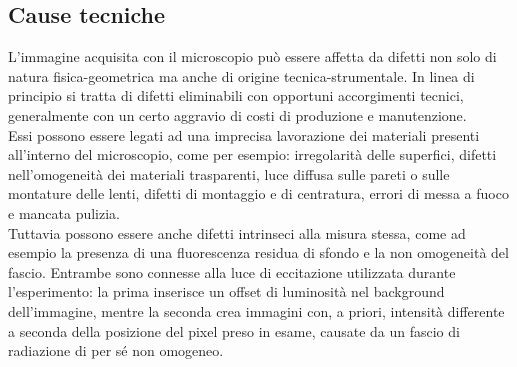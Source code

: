 \subsection {Cause tecniche} 

L'immagine acquisita con il microscopio può essere affetta da difetti non solo di natura fisica-geometrica ma anche di origine tecnica-strumentale. In linea di principio si tratta di difetti eliminabili con opportuni accorgimenti tecnici, generalmente con un certo aggravio di costi di produzione e manutenzione.\\
Essi possono essere legati ad una imprecisa lavorazione dei materiali presenti all'interno del microscopio, come per esempio: irregolarità delle superfici, difetti nell'omogeneità dei materiali trasparenti, luce diffusa sulle pareti o sulle montature delle lenti, difetti di montaggio e di centratura, errori di messa a fuoco e mancata pulizia.\\
Tuttavia possono essere anche difetti intrinseci alla misura stessa, come ad esempio la presenza di una fluorescenza residua di sfondo e la non omogeneità del fascio. Entrambe sono connesse alla luce di eccitazione utilizzata durante l'esperimento: la prima inserisce un offset di luminosità nel background dell'immagine, mentre la seconda crea immagini con, a priori, intensità differente a seconda della posizione del pixel preso in esame, causate da un fascio di radiazione di per sé non omogeneo.

